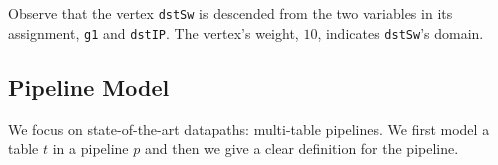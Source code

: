 Observe that the vertex \texttt{dstSw} is descended from the two variables in its assignment, \texttt{g1} and \texttt{dstIP}. The vertex's weight, $10$, indicates \texttt{dstSw}'s domain.








\subsection{Pipeline Model}
\label{subsec:pipeline-model}

We focus on state-of-the-art datapaths: multi-table pipelines. We first model a table $t$ in a pipeline $p$ and then we give a clear definition for the pipeline.

